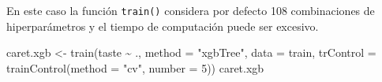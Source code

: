 \documentclass[
  spanish,
]{book}
\newenvironment{Shaded}{\begin{snugshade}}{\end{snugshade}}
\newcommand{\AttributeTok}[1]{\textcolor[rgb]{0.77,0.63,0.00}{#1}}
\newcommand{\DecValTok}[1]{\textcolor[rgb]{0.00,0.00,0.81}{#1}}
\newcommand{\FunctionTok}[1]{\textcolor[rgb]{0.00,0.00,0.00}{#1}}
\newcommand{\NormalTok}[1]{#1}
\newcommand{\OtherTok}[1]{\textcolor[rgb]{0.56,0.35,0.01}{#1}}
\newcommand{\SpecialCharTok}[1]{\textcolor[rgb]{0.00,0.00,0.00}{#1}}
\newcommand{\StringTok}[1]{\textcolor[rgb]{0.31,0.60,0.02}{#1}}
\theoremstyle{break}
\theoremstyle{definition}
\theoremstyle{definition}
\theoremstyle{definition}
\theoremstyle{definition}
\theoremstyle{remark}
\begin{document}
En este caso la función \texttt{train()} considera por defecto 108 combinaciones de hiperparámetros y el tiempo de computación puede ser excesivo.

\begin{Shaded}
\begin{Highlighting}[]
\NormalTok{caret.xgb }\OtherTok{\textless{}{-}} \FunctionTok{train}\NormalTok{(taste }\SpecialCharTok{\textasciitilde{}}\NormalTok{ ., }\AttributeTok{method =} \StringTok{"xgbTree"}\NormalTok{, }\AttributeTok{data =}\NormalTok{ train,}
                   \AttributeTok{trControl =} \FunctionTok{trainControl}\NormalTok{(}\AttributeTok{method =} \StringTok{"cv"}\NormalTok{, }\AttributeTok{number =} \DecValTok{5}\NormalTok{))}
\NormalTok{caret.xgb}
\end{Highlighting}
\end{Shaded}
\end{document}
